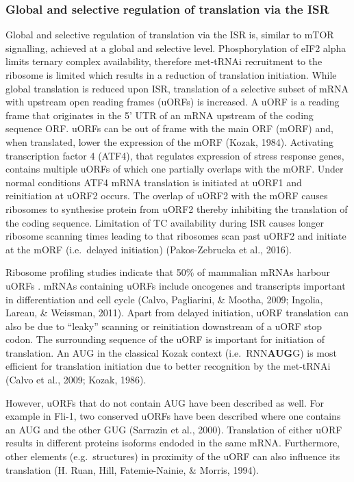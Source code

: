 \documentclass[12pt,openany]{book}
\begin{document}
\subsubsection{Global and selective regulation of translation via the ISR}

Global and selective regulation of translation via the ISR is, similar
to mTOR signalling, achieved at a global and selective level.
Phosphorylation of eIF2 alpha limits ternary complex availability,
therefore met-tRNAi recruitment to the ribosome is limited which results
in a reduction of translation initiation. While global translation is
reduced upon ISR, translation of a selective subset of mRNA with
upstream open reading frames (uORFs) is increased. A uORF is a reading
frame that originates in the 5' UTR of an mRNA upstream of the coding
sequence ORF. uORFs can be out of frame with the main ORF (mORF) and,
when translated, lower the expression of the mORF (Kozak, 1984).
Activating transcription factor 4 (ATF4), that regulates expression of
stress response genes, contains multiple uORFs of which one partially
overlaps with the mORF. Under normal conditions ATF4 mRNA translation is
initiated at uORF1 and reinitiation at uORF2 occurs. The overlap of
uORF2 with the mORF causes ribosomes to synthesise protein from uORF2
thereby inhibiting the translation of the coding sequence. Limitation of
TC availability during ISR causes longer ribosome scanning times leading
to that ribosomes scan past uORF2 and initiate at the mORF (i.e.~delayed
initiation) (Pakos-Zebrucka et al., 2016).

Ribosome profiling studies indicate that 50\% of mammalian mRNAs harbour
uORFs . mRNAs containing uORFs include oncogenes and transcripts
important in differentiation and cell cycle (Calvo, Pagliarini, \&
Mootha, 2009; Ingolia, Lareau, \& Weissman, 2011). Apart from delayed
initiation, uORF translation can also be due to ``leaky'' scanning or
reinitiation downstream of a uORF stop codon. The surrounding sequence
of the uORF is important for initiation of translation. An AUG in the
classical Kozak context (i.e.~RNN\textbf{AUG}G) is most efficient for
translation initiation due to better recognition by the met-tRNAi (Calvo
et al., 2009; Kozak, 1986).

However, uORFs that do not contain AUG have been described as well. For
example in Fli-1, two conserved uORFs have been described where one
contains an AUG and the other GUG (Sarrazin et al., 2000). Translation
of either uORF results in different proteins isoforms endoded in the
same mRNA. Furthermore, other elements (e.g.~structures) in proximity of
the uORF can also influence its translation (H. Ruan, Hill,
Fatemie-Nainie, \& Morris, 1994). \clearpage
\end{document}
